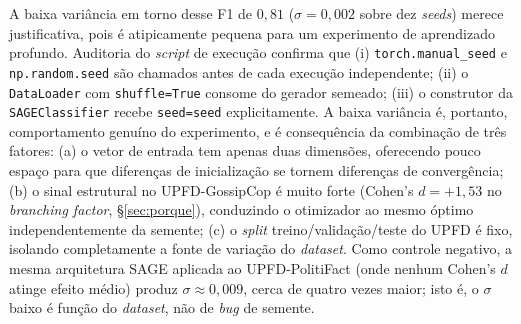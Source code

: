 A baixa vari\^ancia em torno desse F1 de $0{,}81$ ($\sigma = 0{,}002$
sobre dez \emph{seeds}) merece justificativa, pois \'e atipicamente
pequena para um experimento de aprendizado profundo. Auditoria do
\emph{script} de execu\c{c}\~ao confirma que (i) \texttt{torch.manual\_seed}
e \texttt{np.random.seed} s\~ao chamados antes de cada execu\c{c}\~ao
independente; (ii) o \texttt{DataLoader} com \texttt{shuffle=True}
consome do gerador semeado; (iii) o construtor da \texttt{SAGEClassifier}
recebe \texttt{seed=seed} explicitamente. A baixa vari\^ancia \'e,
portanto, comportamento genu\'ino do experimento, e \'e consequ\^encia
da combina\c{c}\~ao de tr\^es fatores: (a) o vetor de entrada tem apenas
duas dimens\~oes, oferecendo pouco espa\c{c}o para que diferen\c{c}as de
inicializa\c{c}\~ao se tornem diferen\c{c}as de converg\^encia; (b) o
sinal estrutural no UPFD-GossipCop \'e muito forte (Cohen's $d = +1{,}53$
no \emph{branching factor}, \S\ref{sec:porque}), conduzindo o otimizador
ao mesmo \'optimo independentemente da semente; (c) o \emph{split}
treino/valida\c{c}\~ao/teste do UPFD \'e fixo, isolando completamente a
fonte de varia\c{c}\~ao do \emph{dataset}. Como controle negativo, a
mesma arquitetura SAGE aplicada ao UPFD-PolitiFact (onde nenhum
Cohen's $d$ atinge efeito m\'edio) produz $\sigma \approx
0{,}009$, cerca de quatro vezes maior; isto \'e, o $\sigma$ baixo \'e
fun\c{c}\~ao do \emph{dataset}, n\~ao de \emph{bug} de semente.

%


